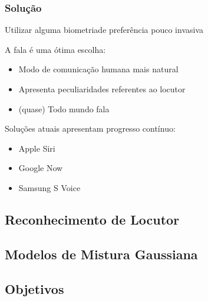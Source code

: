 \begin{frame}
\frametitle{Solução}
\begin{description}
    \item Utilizar alguma biometria\pause\space de preferência pouco invasiva
    \pause
    \item A fala é uma ótima escolha:
    \pause
    \begin{itemize}
        \item Modo de comunicação humana mais natural
        \pause
        \item Apresenta peculiaridades referentes ao locutor
        \pause
        \item (quase) Todo mundo fala
        \pause
    \end{itemize}
    \item Soluções atuais apresentam progresso contínuo:
    \pause
    \begin{itemize}
        \item Apple Siri
        \pause
        \item Google Now
        \pause
        \item Samsung S Voice
    \end{itemize}
\end{description}
\end{frame}

\subsection{Reconhecimento de Locutor}

\subsection{Modelos de Mistura Gaussiana}

\subsection{Objetivos}